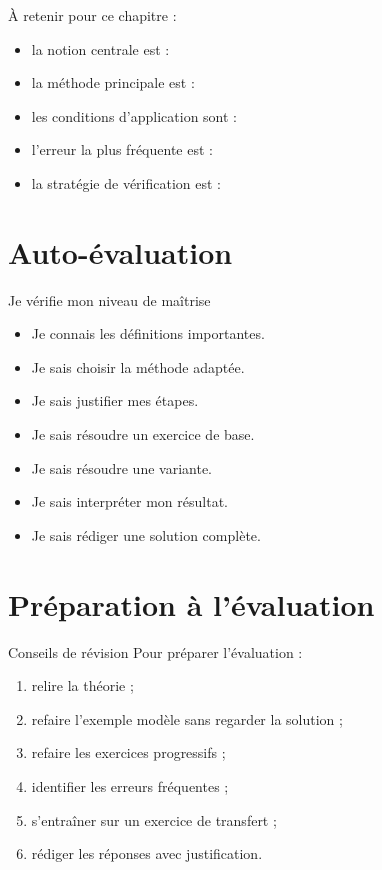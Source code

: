 \documentclass[11pt,a4paper]{article}
\begin{document}
\begin{cadresynthese}
À retenir pour ce chapitre :

\begin{itemize}
    \item la notion centrale est : \dotfill
    \item la méthode principale est : \dotfill
    \item les conditions d’application sont : \dotfill
    \item l’erreur la plus fréquente est : \dotfill
    \item la stratégie de vérification est : \dotfill
\end{itemize}
\end{cadresynthese}

\section{Auto-évaluation}

\begin{cadregris}{Je vérifie mon niveau de maîtrise}
\begin{itemize}
    \item[$\square$] Je connais les définitions importantes.
    \item[$\square$] Je sais choisir la méthode adaptée.
    \item[$\square$] Je sais justifier mes étapes.
    \item[$\square$] Je sais résoudre un exercice de base.
    \item[$\square$] Je sais résoudre une variante.
    \item[$\square$] Je sais interpréter mon résultat.
    \item[$\square$] Je sais rédiger une solution complète.
\end{itemize}
\end{cadregris}

\section{Préparation à l’évaluation}

\begin{cadreorange}{Conseils de révision}
Pour préparer l’évaluation :
\begin{enumerate}
    \item relire la théorie ;
    \item refaire l’exemple modèle sans regarder la solution ;
    \item refaire les exercices progressifs ;
    \item identifier les erreurs fréquentes ;
    \item s’entraîner sur un exercice de transfert ;
    \item rédiger les réponses avec justification.
\end{enumerate}
\end{cadreorange}
\end{document}
